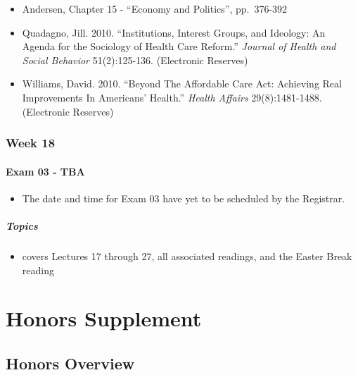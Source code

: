 \documentclass[]{book}
\providecommand{\tightlist}{%
  \setlength{\itemsep}{0pt}\setlength{\parskip}{0pt}}
\newenvironment{rmdblock}[1]
  {\begin{shaded*}
  \begin{itemize}
  \renewcommand{\labelitemi}{
    \raisebox{-.7\height}[0pt][0pt]{
      {\setkeys{Gin}{width=3em,keepaspectratio}\texttt{[image: images/\#1]}}
    }
  }
  \item
  }
  {
  \end{itemize}
  \end{shaded*}
  }
\newenvironment{rmdwarning}
  {\begin{rmdblock}{warning}}
  {\end{rmdblock}}
\begin{document}
\begin{itemize}
\tightlist
\item
  Andersen, Chapter 15 - ``Economy and Politics'', pp.~376-392
\item
  Quadagno, Jill. 2010. ``Institutions, Interest Groups, and Ideology: An Agenda for the Sociology of Health Care Reform.'' \emph{Journal of Health and Social Behavior} 51(2):125-136. (Electronic Reserves)
\item
  Williams, David. 2010. ``Beyond The Affordable Care Act: Achieving Real Improvements In Americans' Health.'' \emph{Health Affairs} 29(8):1481-1488. (Electronic Reserves)
\end{itemize}

\hypertarget{week-18}{%
\section*{Week 18}\label{week-18}}

\hypertarget{exam-03---tba}{%
\subsection*{Exam 03 - TBA}\label{exam-03---tba}}

\begin{rmdwarning}
The date and time for Exam 03 have yet to be scheduled by the Registrar.
\end{rmdwarning}

\hypertarget{topics-32}{%
\subsubsection*{Topics}\label{topics-32}}

\begin{itemize}
\tightlist
\item
  covers Lectures 17 through 27, all associated readings, and the Easter Break reading
\end{itemize}

\hypertarget{part-honors-supplement}{%
\part{Honors Supplement}\label{part-honors-supplement}}

\hypertarget{honors-overview}{%
\chapter{Honors Overview}\label{honors-overview}}
\end{document}
